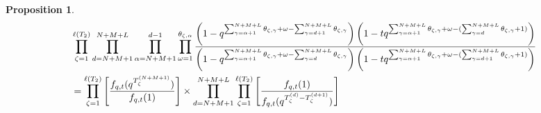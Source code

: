 \documentclass[12pt,reqno,a4paper]{amsart}
\numberwithin{equation}{section}
\newtheorem{prop}[thm]{Proposition}
\theoremstyle{definition}
\begin{document}
\begin{prop}\mbox{}
\label{prpa1-17aug-sun-1329}
\footnotesize
\begin{align}
	&\prod_{\zeta = 1}^{\ell(T_2)}
	\prod_{d = N+M+1}^{N+M+L}
	\prod_{\alpha = N+M+1}^{d - 1} 
	\prod_{\omega = 1}^{\theta_{\zeta,\alpha}}
	\frac{
		\left(	1 - q^{	\sum_{\gamma = \alpha + 1}^{N + M + L} \theta_{\zeta,\gamma}	+ \omega - \sum_{\gamma = d+1}^{N + M + L}\theta_{\zeta,\gamma} 		}			\right)
		\left(	1 - tq^{	\sum_{\gamma = \alpha + 1}^{N + M + L} \theta_{\zeta,\gamma}	+ \omega - (\sum_{\gamma = d}^{N + M + L}\theta_{\zeta,\gamma} 	+ 1 )	}		\right)
	}{
		\left(	1 - q^{	\sum_{\gamma = \alpha + 1}^{N + M + L} \theta_{\zeta,\gamma}	+ \omega - \sum_{\gamma = d}^{N + M + L}\theta_{\zeta,\gamma} 		}			\right)
		\left(	1 - 	tq^{	\sum_{\gamma = \alpha + 1}^{N + M + L} \theta_{\zeta,\gamma}	+ \omega - (\sum_{\gamma = d + 1}^{N + M + L}\theta_{\zeta,\gamma} 	+ 1 )	}			\right)
	}
	\notag 
	\\
	&=
	\prod_{\zeta = 1}^{\ell(T_2)}
	\left[
	\frac{
		f_{q,t}(q^{T^{(N+M+1)}_{\zeta} 		})
	}{
		f_{q,t}(1	)
	}
	\right]
	\times
	\prod_{d = N+M+1}^{N+M+L}
	\prod_{\zeta = 1}^{\ell(T_2)}
	\left[
	\frac{
		f_{q,t}(1)
	}{
		f_{q,t}(q^{T^{(d)}_{\zeta} - T^{(d+1)}_{\zeta}})
	}
	\right]
\end{align}
\normalsize
\end{prop}
\end{document}
